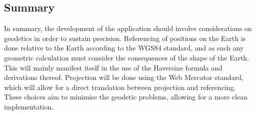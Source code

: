 \subsection{Summary}

In summary, the development of the application should involve considerations on geodetics in order to sustain precision. Referencing of positions on the Earth is done relative to the Earth according to the WGS84 standard, and as such any geometric calculation must consider the consequences of the shape of the Earth. This will mainly manifest itself in the use of the Haversine formula and derivations thereof. Projection will be done using the Web Mercator standard, which will allow for a direct translation between projection and referencing. These choices aim to minimise the geodetic problems, allowing for a more clean implementation.